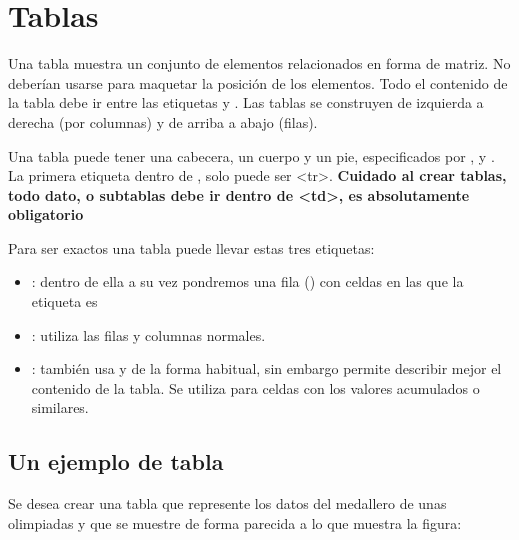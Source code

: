 \documentclass[letterpaper,10pt,spanish]{sphinxmanual}
\begin{document}
\section{Tablas}
\label{tema2:tablas}
Una tabla muestra un conjunto de elementos relacionados en forma de matriz. No deberían usarse para maquetar la posición de los elementos. Todo el contenido de la tabla debe ir entre las etiquetas  y . Las tablas se construyen de izquierda a derecha (por columnas) y de arriba a abajo (filas).

Una tabla puede tener una cabecera, un cuerpo y un pie, especificados por ,  y . La primera etiqueta dentro de , solo puede ser \textless{}tr\textgreater{}. \textbf{Cuidado al crear tablas, todo dato, o subtablas debe ir dentro de \textless{}td\textgreater{}, es absolutamente obligatorio}

Para ser exactos una tabla puede llevar estas tres etiquetas:
\begin{itemize}
\item {} 
: dentro de ella a su vez pondremos una fila () con celdas en las que la etiqueta es 

\item {} 
: utiliza las filas y columnas normales.

\item {} 
: también usa  y  de la forma habitual, sin embargo permite describir mejor el contenido de la tabla. Se utiliza para celdas con los valores acumulados o similares.

\end{itemize}


\subsection{Un ejemplo de tabla}
\label{tema2:un-ejemplo-de-tabla}
Se desea crear una tabla que represente los datos del medallero de unas olimpiadas y que se muestre de forma parecida a lo que muestra la figura:

\end{document}
